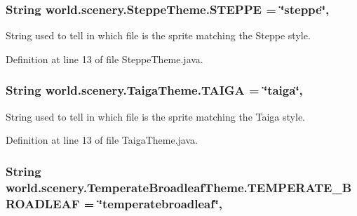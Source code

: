 \hypertarget{interfaceworld_1_1scenery_1_1_steppe_theme_a03bdfdc54a3a5d52694b77342ec34e3e}{
\subsubsection[{S\-T\-E\-P\-P\-E}]{\setlength{\rightskip}{0pt plus 5cm}String world.\-scenery.\-Steppe\-Theme.\-S\-T\-E\-P\-P\-E = \char`\"{}steppe\char`\"{}\hspace{0.3cm}{\ttfamily [static]}, {\ttfamily [inherited]}}}\label{interfaceworld_1_1scenery_1_1_steppe_theme_a03bdfdc54a3a5d52694b77342ec34e3e}


String used to tell in which file is the sprite matching the Steppe style. 



Definition at line 13 of file Steppe\-Theme.\-java.

\hypertarget{interfaceworld_1_1scenery_1_1_taiga_theme_ad3418d8f4936efb0ef1e3eb2009a34f0}{
\subsubsection[{T\-A\-I\-G\-A}]{\setlength{\rightskip}{0pt plus 5cm}String world.\-scenery.\-Taiga\-Theme.\-T\-A\-I\-G\-A = \char`\"{}taiga\char`\"{}\hspace{0.3cm}{\ttfamily [static]}, {\ttfamily [inherited]}}}\label{interfaceworld_1_1scenery_1_1_taiga_theme_ad3418d8f4936efb0ef1e3eb2009a34f0}


String used to tell in which file is the sprite matching the Taiga style. 



Definition at line 13 of file Taiga\-Theme.\-java.

\hypertarget{interfaceworld_1_1scenery_1_1_temperate_broadleaf_theme_a9e9253b684231327dd6ddeca5768033e}{
\subsubsection[{T\-E\-M\-P\-E\-R\-A\-T\-E\-\_\-\-B\-R\-O\-A\-D\-L\-E\-A\-F}]{\setlength{\rightskip}{0pt plus 5cm}String world.\-scenery.\-Temperate\-Broadleaf\-Theme.\-T\-E\-M\-P\-E\-R\-A\-T\-E\-\_\-\-B\-R\-O\-A\-D\-L\-E\-A\-F = \char`\"{}temperatebroadleaf\char`\"{}\hspace{0.3cm}{\ttfamily [static]}, {\ttfamily [inherited]}}}\label{interfaceworld_1_1scenery_1_1_temperate_broadleaf_theme_a9e9253b684231327dd6ddeca5768033e}


